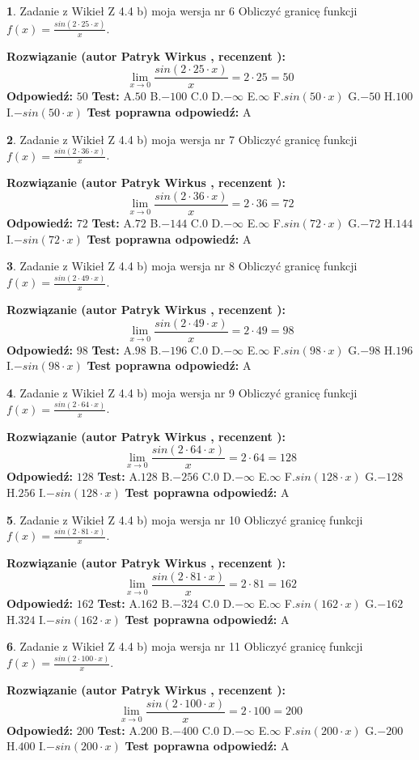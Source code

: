 \documentclass[12pt, a4paper]{article}
\theoremstyle{definition} %
\newtheorem{zad}{}
\newcommand{\zadStart}[1]{\begin{zad}#1\newline}
\newcommand{\zadStop}{\end{zad}}
\newcommand{\rozwStart}[2]{\noindent \textbf{Rozwiązanie (autor #1 , recenzent #2): }\newline}
\newcommand{\rozwStop}{\newline}
\newcommand{\odpStart}{\noindent \textbf{Odpowiedź:}\newline}
\newcommand{\odpStop}{\newline}
\newcommand{\testStart}{\noindent \textbf{Test:}\newline}
\newcommand{\testStop}{\newline}
\newcommand{\kluczStart}{\noindent \textbf{Test poprawna odpowiedź:}\newline}
\newcommand{\kluczStop}{\newline}
\begin{document}
\zadStart{Zadanie z Wikieł Z 4.4 b) moja wersja nr 6}
Obliczyć granicę funkcji $f(x)=\frac{sin(2 \cdot25\cdot x)}{x}$.
\zadStop
\rozwStart{Patryk Wirkus}{}
$$\lim\limits_{x\to 0}\frac{sin(2 \cdot 25\cdot x)}{x}=
2 \cdot 25 = 50$$
\rozwStop
\odpStart
$50$
\odpStop
\testStart
A.$50$
B.$-100$
C.$0$
D.$-\infty$
E.$\infty$
F.$sin(50\cdot x)$
G.$-50$
H.$100$
I.$-sin(50\cdot x)$
\testStop
\kluczStart
A
\kluczStop



\zadStart{Zadanie z Wikieł Z 4.4 b) moja wersja nr 7}
Obliczyć granicę funkcji $f(x)=\frac{sin(2 \cdot36\cdot x)}{x}$.
\zadStop
\rozwStart{Patryk Wirkus}{}
$$\lim\limits_{x\to 0}\frac{sin(2 \cdot 36\cdot x)}{x}=
2 \cdot 36 = 72$$
\rozwStop
\odpStart
$72$
\odpStop
\testStart
A.$72$
B.$-144$
C.$0$
D.$-\infty$
E.$\infty$
F.$sin(72\cdot x)$
G.$-72$
H.$144$
I.$-sin(72\cdot x)$
\testStop
\kluczStart
A
\kluczStop



\zadStart{Zadanie z Wikieł Z 4.4 b) moja wersja nr 8}
Obliczyć granicę funkcji $f(x)=\frac{sin(2 \cdot49\cdot x)}{x}$.
\zadStop
\rozwStart{Patryk Wirkus}{}
$$\lim\limits_{x\to 0}\frac{sin(2 \cdot 49\cdot x)}{x}=
2 \cdot 49 = 98$$
\rozwStop
\odpStart
$98$
\odpStop
\testStart
A.$98$
B.$-196$
C.$0$
D.$-\infty$
E.$\infty$
F.$sin(98\cdot x)$
G.$-98$
H.$196$
I.$-sin(98\cdot x)$
\testStop
\kluczStart
A
\kluczStop



\zadStart{Zadanie z Wikieł Z 4.4 b) moja wersja nr 9}
Obliczyć granicę funkcji $f(x)=\frac{sin(2 \cdot64\cdot x)}{x}$.
\zadStop
\rozwStart{Patryk Wirkus}{}
$$\lim\limits_{x\to 0}\frac{sin(2 \cdot 64\cdot x)}{x}=
2 \cdot 64 = 128$$
\rozwStop
\odpStart
$128$
\odpStop
\testStart
A.$128$
B.$-256$
C.$0$
D.$-\infty$
E.$\infty$
F.$sin(128\cdot x)$
G.$-128$
H.$256$
I.$-sin(128\cdot x)$
\testStop
\kluczStart
A
\kluczStop



\zadStart{Zadanie z Wikieł Z 4.4 b) moja wersja nr 10}
Obliczyć granicę funkcji $f(x)=\frac{sin(2 \cdot81\cdot x)}{x}$.
\zadStop
\rozwStart{Patryk Wirkus}{}
$$\lim\limits_{x\to 0}\frac{sin(2 \cdot 81\cdot x)}{x}=
2 \cdot 81 = 162$$
\rozwStop
\odpStart
$162$
\odpStop
\testStart
A.$162$
B.$-324$
C.$0$
D.$-\infty$
E.$\infty$
F.$sin(162\cdot x)$
G.$-162$
H.$324$
I.$-sin(162\cdot x)$
\testStop
\kluczStart
A
\kluczStop



\zadStart{Zadanie z Wikieł Z 4.4 b) moja wersja nr 11}
Obliczyć granicę funkcji $f(x)=\frac{sin(2 \cdot100\cdot x)}{x}$.
\zadStop
\rozwStart{Patryk Wirkus}{}
$$\lim\limits_{x\to 0}\frac{sin(2 \cdot 100\cdot x)}{x}=
2 \cdot 100 = 200$$
\rozwStop
\odpStart
$200$
\odpStop
\testStart
A.$200$
B.$-400$
C.$0$
D.$-\infty$
E.$\infty$
F.$sin(200\cdot x)$
G.$-200$
H.$400$
I.$-sin(200\cdot x)$
\testStop
\kluczStart
A
\kluczStop
\end{document}
